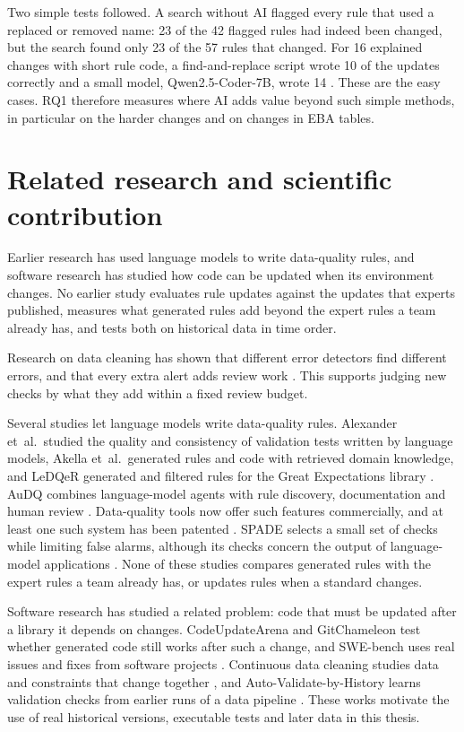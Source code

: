 \documentclass[11pt,a4paper]{article}
\let\oldsection\section
\renewcommand{\section}{\FloatBarrier\oldsection}
\begin{document}
Two simple tests followed. A search without AI flagged every rule that used a replaced or removed name: 23 of the 42 flagged rules had indeed been changed, but the search found only 23 of the 57 rules that changed. For 16 explained changes with short rule code, a find-and-replace script wrote 10 of the updates correctly and a small model, Qwen2.5-Coder-7B, wrote 14 \cite{pilotb}. These are the easy cases. RQ1 therefore measures where AI adds value beyond such simple methods, in particular on the harder changes and on changes in EBA tables.

\section{Related research and scientific contribution}

Earlier research has used language models to write data-quality rules, and software research has studied how code can be updated when its environment changes. No earlier study evaluates rule updates against the updates that experts published, measures what generated rules add beyond the expert rules a team already has, and tests both on historical data in time order.

Research on data cleaning has shown that different error detectors find different errors, and that every extra alert adds review work \cite{abedjan,rein}. This supports judging new checks by what they add within a fixed review budget.

Several studies let language models write data-quality rules. Alexander et~al.\ studied the quality and consistency of validation tests written by language models, Akella et~al.\ generated rules and code with retrieved domain knowledge, and LeDQeR generated and filtered rules for the Great Expectations library \cite{alexander,akella,ledqer}. AuDQ combines language-model agents with rule discovery, documentation and human review \cite{audq}. Data-quality tools now offer such features commercially, and at least one such system has been patented \cite{rehberger,patent}. SPADE selects a small set of checks while limiting false alarms, although its checks concern the output of language-model applications \cite{spade}. None of these studies compares generated rules with the expert rules a team already has, or updates rules when a standard changes.

Software research has studied a related problem: code that must be updated after a library it depends on changes. CodeUpdateArena and GitChameleon test whether generated code still works after such a change, and SWE-bench uses real issues and fixes from software projects \cite{codeupdatearena,gitchameleon,swebench}. Continuous data cleaning studies data and constraints that change together \cite{volkovs}, and Auto-Validate-by-History learns validation checks from earlier runs of a data pipeline \cite{avh}. These works motivate the use of real historical versions, executable tests and later data in this thesis.
\end{document}
